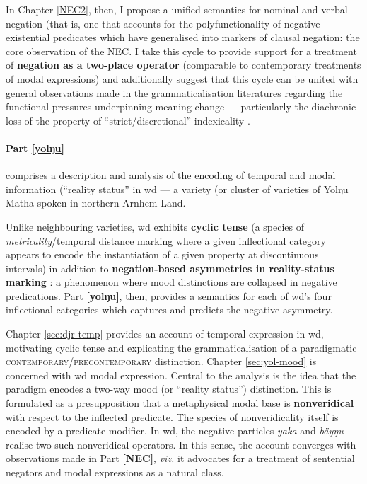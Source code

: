 \documentclass[11pt,dvipsnames]{report}
\begin{document}
In Chapter \ref{NEC2}, then, I propose a unified semantics for nominal and verbal negation (that is, one that accounts for the polyfunctionality of negative existential predicates which have generalised into markers of clausal negation: the core observation of the \acrshort{NEC}.
I take this cycle to provide support for a treatment of \textbf{negation as a two-place operator} (comparable to contemporary treatments of modal expressions) and additionally suggest that this cycle can be united with general observations made in the grammaticalisation literatures regarding the functional pressures underpinning meaning change --- particularly the diachronic loss of the property of ``strict/discretional'' indexicality \citep[see][]{Perry2012}.
 
 
\paragraph{Part \ref{yolŋu}} comprises a description and analysis of the encoding of temporal and modal information (``reality status'' in \acrfull{wd} --- a variety (or cluster of varieties of Yolŋu Matha spoken in northern Arnhem Land.

Unlike neighbouring varieties, \gls{wd} exhibits \textbf{cyclic tense} (a species of \textit{metricality}\slash temporal distance marking where a given inflectional category appears to encode the instantiation of a given property at discontinuous intervals) in addition to \textbf{negation-based asymmetries in reality-status marking} \citep[\textit{cf.}][]{Miestamo2005}: a phenomenon where mood distinctions are collapsed in negative predications. Part \textbf{\ref{yolŋu}}, then, provides a semantics for each of \acrshort{wd}'s four inflectional categories which captures and predicts the negative asymmetry. 


Chapter \ref{sec:djr-temp} provides an account of temporal expression in \acrshort{wd}, motivating cyclic tense and explicating the grammaticalisation of a paradigmatic \textsc{contemporary\slash pre\-con\-temporary} distinction. Chapter \ref{sec:yol-mood} is concerned with \acrshort{wd} modal expression. Central to the analysis is the idea that the paradigm encodes a two-way mood (or ``reality status'') distinction. This is formulated as a presupposition that a metaphysical modal base is \textbf{nonveridical} with respect to the inflected predicate. The species of nonveridicality itself is encoded by a predicate modifier. In \gls{wd}, the negative particles \textit{yaka} and \textit{bäyŋu} realise two such nonveridical operators. In this sense, the account converges with observations made in Part \textbf{\ref{NEC}}, \textit{viz.} it advocates for a treatment of sentential negators and modal expressions as a natural class.
\end{document}
